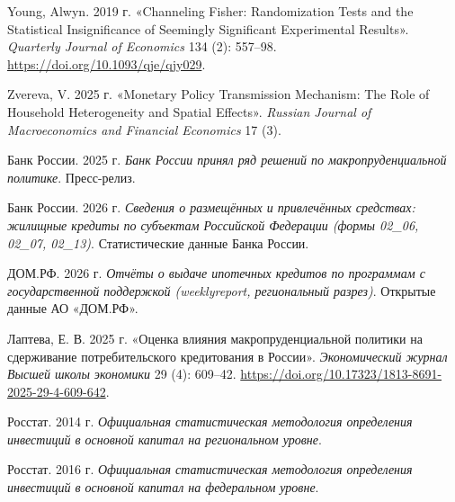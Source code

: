 \documentclass[
  russian,
  11pt,
]{article}
\newlength{\cslhangindent}
\newenvironment{CSLReferences}[2] %
 {\begin{list}{}{%
  \setlength{\itemindent}{0pt}
  \setlength{\leftmargin}{0pt}
  \setlength{\parsep}{0pt}
  \ifodd #1
   \setlength{\leftmargin}{\cslhangindent}
   \setlength{\itemindent}{-1\cslhangindent}
  \fi
  \setlength{\itemsep}{#2\baselineskip}}}
 {\end{list}}
\begin{document}
\begin{CSLReferences}{1}{1}
Young, Alwyn. 2019 г. {«Channeling Fisher: Randomization Tests and the
Statistical Insignificance of Seemingly Significant Experimental
Results»}. \emph{Quarterly Journal of Economics} 134 (2): 557--98.
\url{https://doi.org/10.1093/qje/qjy029}.

Zvereva, V. 2025 г. {«Monetary Policy Transmission Mechanism: The Role
of Household Heterogeneity and Spatial Effects»}. \emph{Russian Journal
of Macroeconomics and Financial Economics} 17 (3).

Банк России. 2025 г. \emph{Банк России принял ряд решений по
макропруденциальной политике}. Пресс-релиз.

Банк России. 2026 г. \emph{Сведения о размещённых и привлечённых
средствах: жилищные кредиты по субъектам Российской Федерации (формы
02\_06, 02\_07, 02\_13)}. Статистические данные Банка России.

ДОМ.РФ. 2026 г. \emph{Отчёты о выдаче ипотечных кредитов по программам с
государственной поддержкой (weeklyreport, региональный разрез)}.
Открытые данные АО «ДОМ.РФ».

Лаптева, Е. В. 2025 г. {«Оценка влияния макропруденциальной политики на
сдерживание потребительского кредитования в России»}.
\emph{Экономический журнал Высшей школы экономики} 29 (4): 609--42.
\url{https://doi.org/10.17323/1813-8691-2025-29-4-609-642}.

Росстат. 2014 г. \emph{Официальная статистическая методология
определения инвестиций в основной капитал на региональном уровне}.

Росстат. 2016 г. \emph{Официальная статистическая методология
определения инвестиций в основной капитал на федеральном уровне}.

\end{CSLReferences}
\end{document}
